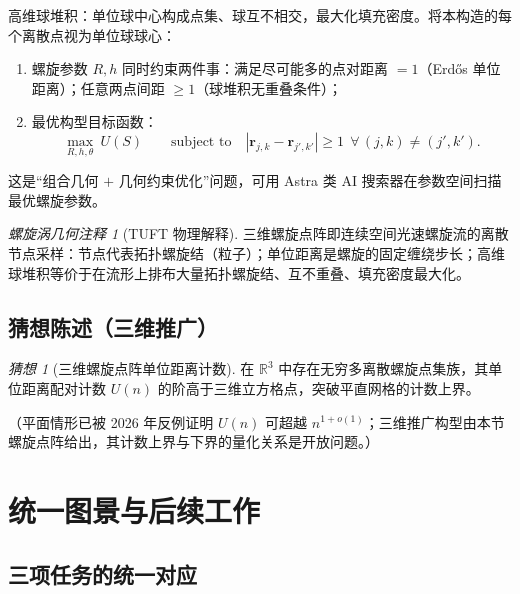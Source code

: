 \documentclass[11pt,a4paper]{article}
\newcommand{\R}{\mathbb{R}}
\newcommand{\br}{\bm{r}}
\theoremstyle{remark}
\newtheorem{remark}[theorem]{螺旋涡几何注释}
\newtheorem{conj}[theorem]{猜想}
\begin{document}
高维球堆积：单位球中心构成点集、球互不相交，最大化填充密度。将本构造的每个离散点视为单位球球心：

\begin{enumerate}[label=\arabic*.]
\item 螺旋参数 $R,h$ 同时约束两件事：满足尽可能多的点对距离 $=1$（Erd\H{o}s 单位距离）；任意两点间距 $\ge1$（球堆积无重叠条件）；
\item 最优构型目标函数：
\begin{equation}
\label{eq:optim}
\max_{R,h,\theta}\ U(S)\qquad \text{subject to}\quad |\br_{j,k}-\br_{j',k'}|\ge1\ \ \forall\,(j,k)\ne(j',k').
\end{equation}
\end{enumerate}

这是“组合几何 $+$ 几何约束优化”问题，可用 Astra 类 AI 搜索器在参数空间扫描最优螺旋参数。

\begin{remark}[TUFT 物理解释]
三维螺旋点阵即连续空间光速螺旋流的离散节点采样：节点代表拓扑螺旋结（粒子）；单位距离是螺旋的固定缠绕步长；高维球堆积等价于在流形上排布大量拓扑螺旋结、互不重叠、填充密度最大化。
\end{remark}

\subsection{猜想陈述（三维推广）}

\begin{conj}[三维螺旋点阵单位距离计数]
在 $\R^{3}$ 中存在无穷多离散螺旋点集族，其单位距离配对计数 $U(n)$ 的阶高于三维立方格点，突破平直网格的计数上界。
\end{conj}

（平面情形已被 2026 年反例证明 $U(n)$ 可超越 $n^{1+o(1)}$；三维推广构型由本节螺旋点阵给出，其计数上界与下界的量化关系是开放问题。）

\section{统一图景与后续工作}

\subsection{三项任务的统一对应}
\end{document}
